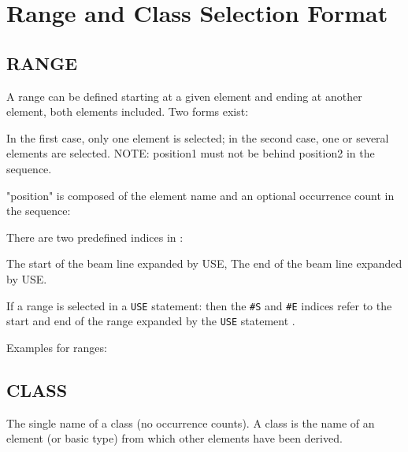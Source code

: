 
\chapter{Range and Class Selection Format}

\section{RANGE}
\label{sec:range}

A range can be defined starting at  a given element and ending at
another element, both elements included. Two forms exist:  


In the first case, only one element is selected; in the second case, one
or several elements are selected. NOTE: position1 must not be behind
position2 in the sequence.  

"position" is composed of the element name and an optional occurrence 
count in the sequence: \label{range_position}

There are two predefined indices in \madx: 
\begin{madlist}
    The start of the beam line expanded by USE, 
    The end of the beam line expanded by USE. 
\end{madlist} 

If a range is selected in a {\tt USE} statement: 
then the  {\tt \#S} and {\tt \#E} indices refer to the start and end of the 
range expanded by the {\tt USE} statement . 

 Examples for ranges: 

\section{CLASS}
\label{sec:class} 
The single name of a class (no occurrence counts). A class is the name
of an element (or basic type) from which other elements have been
derived. 

